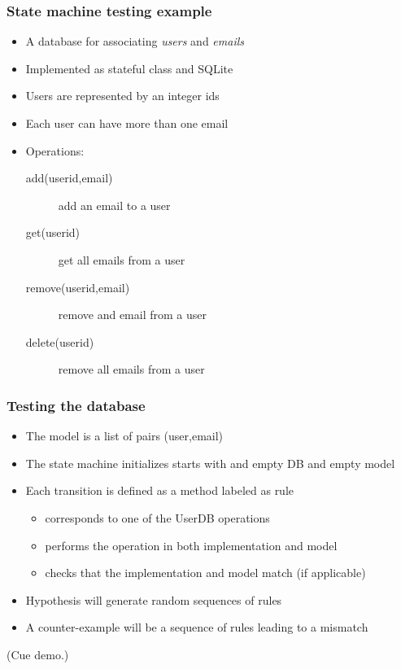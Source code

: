 \documentclass{beamer}
\begin{document}
\begin{frame}
  \frametitle{State machine testing example}

  \begin{itemize}
  \item A database for associating \emph{users} and \emph{emails}
  \item Implemented as stateful class and SQLite 
  \item Users are represented by an integer ids
  \item Each user can have more than one email
  \item Operations:
    \begin{description}
    \item[add(userid,email)]  add an email to a user
    \item[get(userid)] get all emails from a user
    \item[remove(userid,email)] remove and email from a user
    \item[delete(userid)] remove all emails from a user
    \end{description}
  \end{itemize}
\end{frame}

\begin{frame}
  \frametitle{Testing the database}

  \begin{itemize}
  \item The model is a list of pairs (user,email)
  \item The state machine initializes starts with and empty DB
    and empty model
  \item Each transition is defined as a method labeled as \alert{rule}
    \begin{itemize}
    \item corresponds to one of the UserDB operations
    \item performs the operation in both implementation and model
    \item checks that the implementation and model match (if applicable)
    \end{itemize}
  \item Hypothesis will generate random sequences of rules
  \item A counter-example will be a \alert{sequence of rules}
    leading to a mismatch
  \end{itemize}

  (Cue demo.)
\end{frame}
\end{document}
